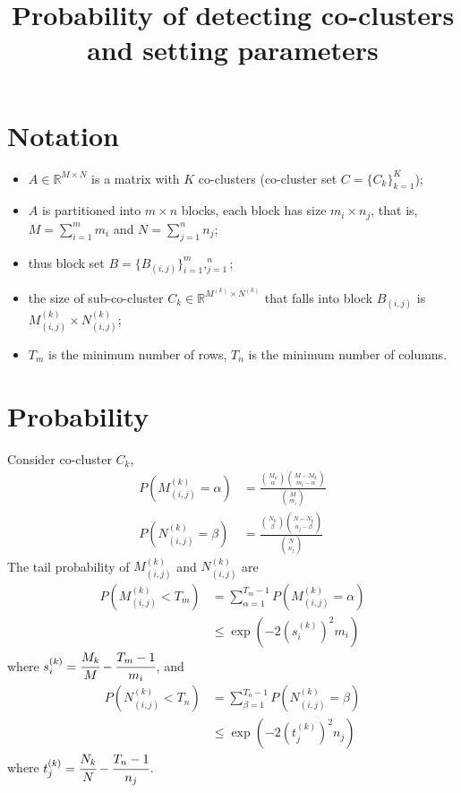 \documentclass[12pt]{article}
\title{Probability of detecting co-clusters and setting parameters}
\author{}
\date{}
\begin{document}
\maketitle
\section{Notation}
\begin{itemize}
    \item $A \in \mathbb{R}^{M \times N}$ is a matrix with $K$ co-clusters (co-cluster set $C = \{C_k\}_{k=1}^K$);
    \item $A$ is partitioned into $m \times n$ blocks, each block has size $m_i \times n_j$, that is, $M=\sum_{i=1}^m m_i$ and $N=\sum_{j=1}^n n_j$;
    \item thus block set $B = \{B_{(i,j)}\}_{i=1}^m,_{j=1}^n$;
    \item the size of sub-co-cluster $C_k \in \mathbb{R}^{M^{(k)} \times N^{(k)}}$ that falls into block $B_{(i,j)}$ is $M_{(i,j)}^{(k)} \times N_{(i,j)}^{(k)}$;
    \item $T_m$ is the minimum number of rows, $T_n$ is the minimum number of columns.
\end{itemize}

\section{Probability}
Consider co-cluster $C_k$,
\begin{align*}
    P(M_{(i,j)}^{(k)} = \alpha) & = \frac{\binom{M_k}{\alpha} \binom{M-M_k}{m_i-\alpha}}{\binom{M}{m_i}} \\
    P(N_{(i,j)}^{(k)} = \beta)  & = \frac{\binom{N_k}{\beta} \binom{N-N_k}{n_j-\beta}}{\binom{N}{n_j}}
\end{align*}
The tail probability of $M_{(i,j)}^{(k)}$ and $N_{(i,j)}^{(k)}$ are
\begin{align*}
    P(M_{(i,j)}^{(k)} < T_m) & = \sum_{\alpha=1}^{T_m-1} P(M_{(i,j)}^{(k)} = \alpha) \\
                             & \le \exp(-2 (s_i^{(k)})^2 m_i)
\end{align*}
where $s_i^{(k)} = \cfrac{M_k}{M}-\cfrac{T_m-1}{m_i}$, and
\begin{align*}
    P(N_{(i,j)}^{(k)} < T_n) & = \sum_{\beta=1}^{T_n-1} P(N_{(i,j)}^{(k)} = \beta) \\
                             & \le \exp (-2 (t_j^{(k)})^2 n_j)
\end{align*}
where $t_j^{(k)} = \cfrac{N_k}{N}-\cfrac{T_n-1}{n_j}$.
\end{document}
